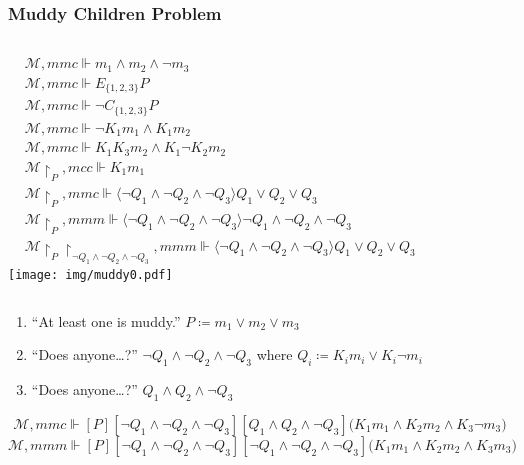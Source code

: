 \documentclass[UTF8,aspectratio=43,11pt,colorlinks,compress,openany]{beamer}%
\begin{document}
\begin{frame}\frametitle{Muddy Children Problem}\vspace*{-10pt}
\begin{columns}
\column{\textwidth}
\begin{align*}
&\mathcal{M},mmc\Vdash m_1\wedge m_2\wedge\neg m_3\\
&\mathcal{M},mmc\Vdash E_{\{1,2,3\}} P\\
&\mathcal{M},mmc\Vdash \neg C_{\{1,2,3\}} P\\
&\mathcal{M},mmc\Vdash \neg K_1m_1\wedge K_1m_2\\
&\mathcal{M},mmc\Vdash K_1K_3m_2\wedge K_1\neg K_2m_2\\
&\mathcal{M}{\restriction_P},mcc\Vdash K_1m_1\\
&\mathcal{M}{\restriction_P},mmc\Vdash\langle \neg Q_1\wedge\neg Q_2\wedge\neg Q_3\rangle Q_1\vee Q_2\vee Q_3\\
&\mathcal{M}{\restriction_P},mmm\Vdash\langle \neg Q_1\wedge\neg Q_2\wedge\neg Q_3\rangle \neg Q_1\wedge\neg Q_2\wedge\neg Q_3\\
&\mathcal{M}{\restriction_P}{\restriction_{\neg Q_1\wedge\neg Q_2\wedge\neg Q_3}},mmm\Vdash\langle \neg Q_1\wedge\neg Q_2\wedge\neg Q_3\rangle Q_1\vee Q_2\vee Q_3
\end{align*}
\vspace{.45\textwidth}\hspace*{-1.5\textwidth}
\texttt{[image: img/muddy0.pdf]}
\end{columns}
\begin{enumerate}
	\item ``At least one is muddy.'' $P\coloneqq m_1\vee m_2\vee m_3$
	\item ``Does anyone\dots?'' $\neg Q_1\wedge\neg Q_2\wedge\neg Q_3$ where $Q_i\coloneqq K_im_i\vee K_i\neg m_i$
	\item ``Does anyone\dots?'' $Q_1\wedge Q_2\wedge\neg Q_3$
\end{enumerate}
\[\mathcal{M},mmc\Vdash[P][\neg Q_1\wedge\neg Q_2\wedge\neg Q_3][Q_1\wedge Q_2\wedge\neg Q_3]\big(K_1m_1\wedge K_2m_2\wedge K_3\neg m_3\big)\]
\[\mathcal{M},mmm\Vdash[P][\neg Q_1\wedge\neg Q_2\wedge\neg Q_3][\neg Q_1\wedge\neg Q_2\wedge\neg Q_3]\big(K_1m_1\wedge K_2m_2\wedge K_3m_3\big)\]
\end{frame}
\end{document}
